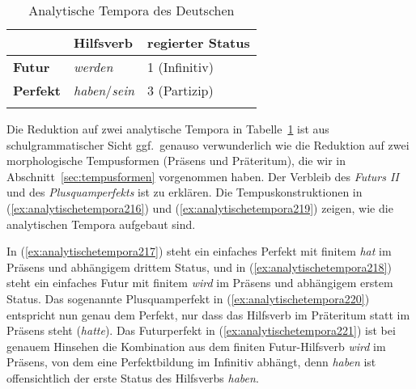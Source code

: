 
\begin{table}[!htbp]
  \centering
  \begin{tabular}{lll}
    \lsptoprule
    & \textbf{Hilfsverb} & \textbf{regierter Status} \\
    \midrule
    \textbf{Futur} & \textit{werden} & 1 (Infinitiv) \\
    \textbf{Perfekt} & \textit{haben}\slash\textit{sein} & 3 (Partizip) \\
    \lspbottomrule
  \end{tabular}
  \caption{Analytische Tempora des Deutschen}
  \label{tab:analytischetempora215}
\end{table}

Die Reduktion auf zwei analytische Tempora in Tabelle~\ref{tab:analytischetempora215} ist aus schulgrammatischer Sicht ggf.\ genauso verwunderlich wie die Reduktion auf zwei morphologische Tempusformen (Präsens und Präteritum), die wir in Abschnitt~\ref{sec:tempusformen} vorgenommen haben.
Der Verbleib des \textit{Futurs II} und des \textit{Plusquamperfekts} ist zu erklären.
Die Tempuskonstruktionen in (\ref{ex:analytischetempora216}) und (\ref{ex:analytischetempora219}) zeigen, wie die analytischen Tempora aufgebaut sind.

\begin{exe}
  \ex\label{ex:analytischetempora216}
  \begin{xlist}
  \end{xlist}
  \ex\label{ex:analytischetempora219}
  \begin{xlist}
  \end{xlist}
\end{exe}

In (\ref{ex:analytischetempora217}) steht ein einfaches Perfekt mit finitem \textit{hat} im Präsens und abhängigem drittem Status, und in (\ref{ex:analytischetempora218}) steht ein einfaches Futur mit finitem \textit{wird} im Präsens und abhängigem erstem Status.
Das sogenannte Plusquamperfekt in (\ref{ex:analytischetempora220}) entspricht nun genau dem Perfekt, nur dass das Hilfsverb im Präteritum statt im Präsens steht (\textit{hatte}).
Das Futurperfekt in (\ref{ex:analytischetempora221}) ist bei genauem Hinsehen die Kombination aus dem finiten Futur-Hilfsverb \textit{wird} im Präsens, von dem eine Perfektbildung im Infinitiv abhängt, denn \textit{haben} ist offensichtlich der erste Status des Hilfsverbs \textit{haben}.

